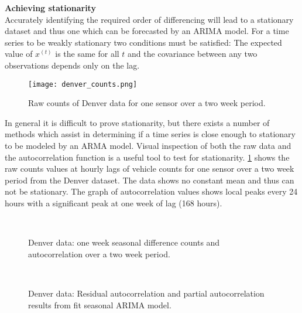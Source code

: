 \bigskip
\noindent \textbf{Achieving stationarity} \\
Accurately identifying the required order of differencing will lead to a stationary dataset and thus one which can be forecasted by an ARIMA model.  For a time series to be weakly stationary two conditions must be satisfied: The expected value of $x^{(t)}$ is the same for all $t$ and the covariance between any two observations depends only on the lag.  

\begin{figure}[]
	\begin{center}
		\texttt{[image: denver\_counts.png]}
	\end{center}
	\caption{Raw counts of Denver data for one sensor over a two week period.}
	\label{fig:denver_raw_data}
\end{figure}

In general it is difficult to prove stationarity, but there exists a number of methods which assist in determining if a time series is close enough to stationary to be modeled by an ARMA model.  Visual inspection of both the raw data and the autocorrelation function is a useful tool to test for stationarity.  \ref{fig:denver_raw_data} shows the raw counts values at hourly lags of vehicle counts for one sensor over a two week period from the Denver dataset.  The data shows no constant mean and thus can not be stationary.  The graph of autocorrelation values shows local peaks every 24 hours with a significant peak at one week of lag (168 hours).

\begin{figure}[!t]
\begin{center}
 \\
\end{center}
\caption{Denver data: one week seasonal difference counts and autocorrelation over a two week period.}
\label{fig:lag_data}
\end{figure}

\begin{figure}[!t]
\begin{center}
 \\
\end{center}
\caption{Denver data: Residual autocorrelation and partial autocorrelation results from fit seasonal ARIMA model.}
\label{fig:fit_lag_data}
\end{figure}



